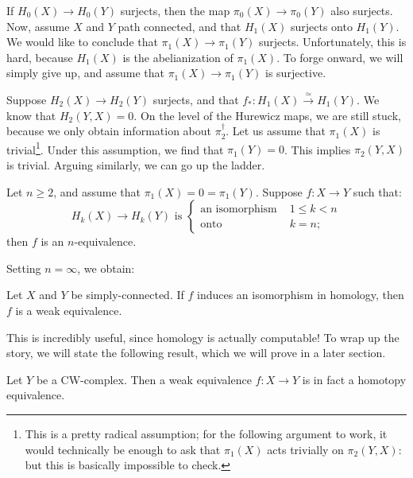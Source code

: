 If $H_0(X)\to H_0(Y)$ surjects, then the map $\pi_0(X)\to \pi_0(Y)$ also surjects.
Now, assume $X$ and $Y$ path connected,  and that $H_1(X)$ surjects onto $H_1(Y)$.
We would like to conclude that $\pi_1(X)\to\pi_1(Y)$ surjects.
Unfortunately, this is hard, because $H_1(X)$ is the abelianization of $\pi_1(X)$.
To forge onward, we will simply give up, and assume that $\pi_1(X)\to \pi_1(Y)$ is surjective.

Suppose $H_2(X)\to H_2(Y)$ surjects, and that $f_\ast:H_1(X)\xrightarrow{\simeq}H_1(Y)$.
We know that $H_2(Y,X) = 0$.
On the level of the Hurewicz maps, we are still stuck, because we only obtain information about $\pi_2^\dagger$.
Let us assume that $\pi_1(X)$ is trivial\footnote{This is a pretty radical assumption; for the following argument to work,
it would technically be enough to ask that $\pi_1(X)$ acts trivially on $\pi_2(Y,X)$: but this is basically impossible to check.}.
Under this assumption, we find that $\pi_1(Y) = 0$.
This implies $\pi_2(Y,X)$ is trivial.
Arguing similarly, we can go up the ladder.
\begin{theorem}[Whitehead]
    Let $n\geq 2$, and assume that $\pi_1(X) = 0 = \pi_1(Y)$.
    Suppose $f:X\to Y$ such that:
    \begin{equation*}
	H_k(X)\to H_k(Y) \text{ is }\begin{cases}
	    \text{an isomorphism } & 1\leq k<n\\
	    \text{onto } & k = n;
	\end{cases}
    \end{equation*}
    then $f$ is an $n$-equivalence.
\end{theorem}
Setting $n=\infty$, we obtain:
\begin{corollary}
    Let $X$ and $Y$ be simply-connected.
    If $f$ induces an isomorphism in homology, then $f$ is a weak equivalence.
\end{corollary}
This is incredibly useful, since homology is actually computable!
To wrap up the story, we will state the following result, which we will prove in a later section.
\begin{theorem}\label{weakhtpyequiv}
    Let $Y$ be a CW-complex.
    Then a weak equivalence $f:X\to Y$ is in fact a homotopy equivalence.
\end{theorem}
